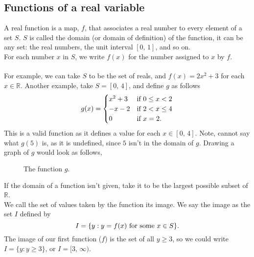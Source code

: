 \documentclass[10pt, a4paper]{article}
\newcommand{\R}{\mathbb{R}}
\begin{document}
\subsection{Functions of a real variable}
A real function is a map, $f$, that associates a real number to every element of a set $S$. $S$ is called the domain (or domain of definition) of the function, it can be any set: the real numbers, the unit interval $[0,\,1]$, and so on. \\
For each number $x$ in $S$, we write $f(x)$ for the number assigned to $x$ by $f$. \\
\\
For example, we can take $S$ to be the set of reals, and $f(x) = 2x ^ 2 + 3$ for each $x \in \R$. Another example, take $S = [0,\,4]$, and define $g$ as follows
\[
g(x) =
\begin{cases}
    x ^ 2 + 3 &\textnormal{if } 0 \leq x < 2 \\
    -x - 2 &\textnormal{if } 2 < x \leq 4 \\
    0 &\textnormal{if } x = 2.
\end{cases}
\]
This is a valid function as it defines a value for each $x \in [0,\,4]$. Note, cannot say what $g(5)$ is, as it is undefined, since $5$ isn't in the domain of $g$.  Drawing a graph of $g$ would look as follows,
\begin{figure}[ht]
    \centering
    \caption{The function $g$.}
    \label{fig:func1}
\end{figure}
If the domain of a function isn't given, take it to be the largest possible subset of $\R$. \\
We call the set of values taken by the function its image. We say the image as the set $I$ defined by
\[
I = \{y : y = f(x) \textnormal{ for some } x \in S\}.
\]
The image of our first function ($f$) is the set of all $y \geq 3$, so we could write $I = \{y : y \geq 3\}$, or $I = [3,\,\infty)$. \\
\end{document}
